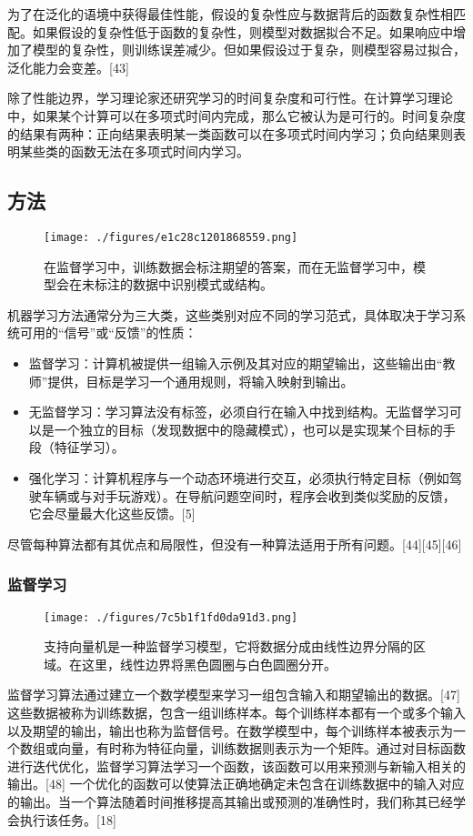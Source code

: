 为了在泛化的语境中获得最佳性能，假设的复杂性应与数据背后的函数复杂性相匹配。如果假设的复杂性低于函数的复杂性，则模型对数据拟合不足。如果响应中增加了模型的复杂性，则训练误差减少。但如果假设过于复杂，则模型容易过拟合，泛化能力会变差。[43]

除了性能边界，学习理论家还研究学习的时间复杂度和可行性。在计算学习理论中，如果某个计算可以在多项式时间内完成，那么它被认为是可行的。时间复杂度的结果有两种：正向结果表明某一类函数可以在多项式时间内学习；负向结果则表明某些类的函数无法在多项式时间内学习。
\subsection{方法}
\begin{figure}[ht]
\centering
\texttt{[image: ./figures/e1c28c1201868559.png]}
\caption{在监督学习中，训练数据会标注期望的答案，而在无监督学习中，模型会在未标注的数据中识别模式或结构。} \label{fig_JQXX_2}
\end{figure}
机器学习方法通常分为三大类，这些类别对应不同的学习范式，具体取决于学习系统可用的“信号”或“反馈”的性质：
\begin{itemize}
\item 监督学习：计算机被提供一组输入示例及其对应的期望输出，这些输出由“教师”提供，目标是学习一个通用规则，将输入映射到输出。
\item 无监督学习：学习算法没有标签，必须自行在输入中找到结构。无监督学习可以是一个独立的目标（发现数据中的隐藏模式），也可以是实现某个目标的手段（特征学习）。
\item 强化学习：计算机程序与一个动态环境进行交互，必须执行特定目标（例如驾驶车辆或与对手玩游戏）。在导航问题空间时，程序会收到类似奖励的反馈，它会尽量最大化这些反馈。[5]
\end{itemize}
尽管每种算法都有其优点和局限性，但没有一种算法适用于所有问题。[44][45][46]
\subsubsection{监督学习}
\begin{figure}[ht]
\centering
\texttt{[image: ./figures/7c5b1f1fd0da91d3.png]}
\caption{支持向量机是一种监督学习模型，它将数据分成由线性边界分隔的区域。在这里，线性边界将黑色圆圈与白色圆圈分开。} \label{fig_JQXX_3}
\end{figure}
监督学习算法通过建立一个数学模型来学习一组包含输入和期望输出的数据。[47] 这些数据被称为训练数据，包含一组训练样本。每个训练样本都有一个或多个输入以及期望的输出，输出也称为监督信号。在数学模型中，每个训练样本被表示为一个数组或向量，有时称为特征向量，训练数据则表示为一个矩阵。通过对目标函数进行迭代优化，监督学习算法学习一个函数，该函数可以用来预测与新输入相关的输出。[48] 一个优化的函数可以使算法正确地确定未包含在训练数据中的输入对应的输出。当一个算法随着时间推移提高其输出或预测的准确性时，我们称其已经学会执行该任务。[18]

